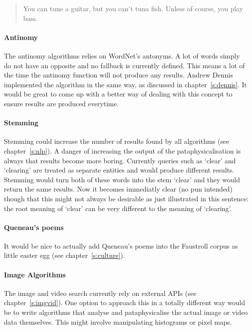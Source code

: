 \begin{quotation}
   You can tune a guitar, but you can't tuna fish. Unless of course, you play bass. 
\end{quotation}

\paragraph{Antinomy}
The antinomy algorithms relies on WordNet's antonyms. A lot of words simply do not have an opposite and no fallback is currently defined. This means a lot of the time the antinomy function will not produce any results. Andrew Dennis implemented the algorithm in the same way, as discussed in chapter~\ref{s:dennis}. It would be great to come up with a better way of dealing with this concept to ensure results are produced everytime.

\paragraph{Stemming}
Stemming could increase the number of results found by all algorithms (see chapter~\ref{s:nlp}). A danger of increasing the output of the pataphysicalisation is always that results become more boring. Currently queries such as `clear' and `clearing' are treated as separate entities and would produce different results. Stemming would turn both of these words into the stem `clear' and they would return the same results. Now it becomes immediatly clear (no pun intended) though that this might not always be desirable as just illustrated in this sentence: the root meaning of `clear' can be very different to the meaning of `clearing'.

\paragraph{Queneau's poems}
It would be nice to actually add Queneau's poems \autocite{Queneau1961} into the Faustroll corpus as little easter egg (see chapter~\ref{s:culture}).

\paragraph{Image Algorithms}
\label{s:imgalgoimprovs}
The image and video search currently rely on external \ac{API}s (see chapter~\ref{s:imgvid}). One option to approach this in a totally different way would be to write algorithms that analyse and pataphysicalise the actual image or video data themselves. This might involve manipulating histograms or pixel maps.

